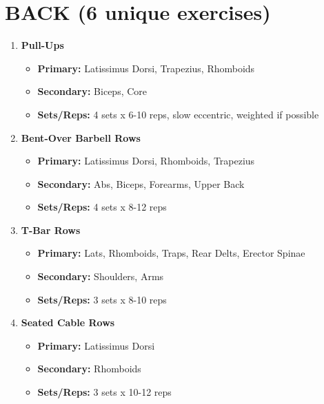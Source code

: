 \documentclass{article}
\begin{document}
\section*{BACK (6 unique exercises)}
\begin{enumerate}[label=\arabic*., wide=0pt, leftmargin=*] %
    \item \textbf{Pull-Ups}
        \begin{itemize}[label=\textbullet, leftmargin=*, nosep, topsep=0pt, partopsep=0pt] %
            \item \textbf{Primary:} Latissimus Dorsi, Trapezius, Rhomboids
            \item \textbf{Secondary:} Biceps, Core
            \item \textbf{Sets/Reps:} 4 sets x 6-10 reps, slow eccentric, weighted if possible
        \end{itemize}

    \item \textbf{Bent-Over Barbell Rows}
        \begin{itemize}[label=\textbullet, leftmargin=*, nosep, topsep=0pt, partopsep=0pt]
            \item \textbf{Primary:} Latissimus Dorsi, Rhomboids, Trapezius
            \item \textbf{Secondary:} Abs, Biceps, Forearms, Upper Back
            \item \textbf{Sets/Reps:} 4 sets x 8-12 reps
        \end{itemize}

    \item \textbf{T-Bar Rows}
        \begin{itemize}[label=\textbullet, leftmargin=*, nosep, topsep=0pt, partopsep=0pt]
            \item \textbf{Primary:} Lats, Rhomboids, Traps, Rear Delts, Erector Spinae
            \item \textbf{Secondary:} Shoulders, Arms
            \item \textbf{Sets/Reps:} 3 sets x 8-10 reps
        \end{itemize}

    \item \textbf{Seated Cable Rows}
        \begin{itemize}[label=\textbullet, leftmargin=*, nosep, topsep=0pt, partopsep=0pt]
            \item \textbf{Primary:} Latissimus Dorsi
            \item \textbf{Secondary:} Rhomboids
            \item \textbf{Sets/Reps:} 3 sets x 10-12 reps
        \end{itemize}


\end{enumerate}
\end{document}
